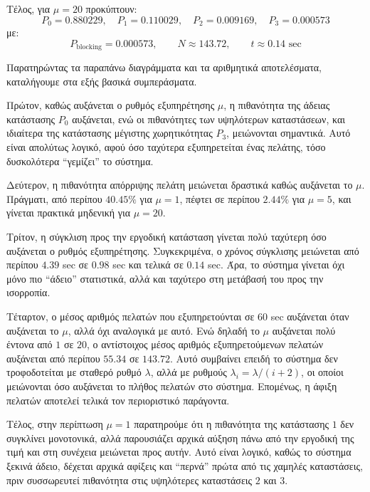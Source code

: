 \documentclass{article}
\begin{document}
Τέλος, για \(\mu=20\) προκύπτουν:
\begin{equation}
P_0=0.880229,\quad
P_1=0.110029,\quad
P_2=0.009169,\quad
P_3=0.000573
\end{equation}
με:
\begin{equation}
P_{\text{blocking}}=0.000573,\qquad
N \approx 143.72,\qquad
t \approx 0.14 \text{ sec}
\end{equation}

Παρατηρώντας τα παραπάνω διαγράμματα και τα αριθμητικά αποτελέσματα,
καταλήγουμε στα εξής βασικά συμπεράσματα.

Πρώτον, καθώς αυξάνεται ο ρυθμός εξυπηρέτησης \(\mu\), η πιθανότητα της άδειας
κατάστασης \(P_0\) αυξάνεται, ενώ οι πιθανότητες των υψηλότερων καταστάσεων,
και ιδιαίτερα της κατάστασης μέγιστης χωρητικότητας \(P_3\), μειώνονται
σημαντικά. Αυτό είναι απολύτως λογικό, αφού όσο ταχύτερα εξυπηρετείται ένας
πελάτης, τόσο δυσκολότερα ``γεμίζει'' το σύστημα.

Δεύτερον, η πιθανότητα απόρριψης πελάτη μειώνεται δραστικά καθώς αυξάνεται το
\(\mu\). Πράγματι, από περίπου \(40.45\%\) για \(\mu=1\), πέφτει σε περίπου
\(2.44\%\) για \(\mu=5\), και γίνεται πρακτικά μηδενική για \(\mu=20\).

Τρίτον, η σύγκλιση προς την εργοδική κατάσταση γίνεται πολύ ταχύτερη όσο
αυξάνεται ο ρυθμός εξυπηρέτησης. Συγκεκριμένα, ο χρόνος σύγκλισης μειώνεται
από περίπου \(4.39\) sec σε \(0.98\) sec και τελικά σε \(0.14\) sec. Άρα, το
σύστημα γίνεται όχι μόνο πιο ``άδειο'' στατιστικά, αλλά και ταχύτερο στη
μετάβασή του προς την ισορροπία.

Τέταρτον, ο μέσος αριθμός πελατών που εξυπηρετούνται σε \(60\) sec αυξάνεται
όταν αυξάνεται το \(\mu\), αλλά όχι αναλογικά με αυτό. Ενώ δηλαδή το \(\mu\)
αυξάνεται πολύ έντονα από \(1\) σε \(20\), ο αντίστοιχος μέσος αριθμός
εξυπηρετούμενων πελατών αυξάνεται από περίπου \(55.34\) σε \(143.72\). Αυτό
συμβαίνει επειδή το σύστημα δεν τροφοδοτείται με σταθερό ρυθμό \(\lambda\),
αλλά με ρυθμούς \(\lambda_i=\lambda/(i+2)\), οι οποίοι μειώνονται όσο
αυξάνεται το πλήθος πελατών στο σύστημα. Επομένως, η άφιξη πελατών αποτελεί
τελικά τον περιοριστικό παράγοντα.

Τέλος, στην περίπτωση \(\mu=1\) παρατηρούμε ότι η πιθανότητα της κατάστασης
\(1\) δεν συγκλίνει μονοτονικά, αλλά παρουσιάζει αρχικά αύξηση πάνω από την
εργοδική της τιμή και στη συνέχεια μειώνεται προς αυτήν. Αυτό είναι λογικό,
καθώς το σύστημα ξεκινά άδειο, δέχεται αρχικά αφίξεις και ``περνά'' πρώτα από
τις χαμηλές καταστάσεις, πριν συσσωρευτεί πιθανότητα στις υψηλότερες
καταστάσεις \(2\) και \(3\).
\end{document}
